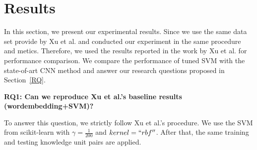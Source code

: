 \documentclass[sigconf,review, anonymous]{acmart}
\theoremstyle{break}
\begin{document}
\section{Results}
In this section, we present our experimental results. Since we use the same data set provide by Xu
et al.\cite{xu2016predicting} and conducted our experiment in the same procedure and metics. 
Therefore, we used the results reported in the work by Xu et al.\cite{xu2016predicting} for performance
comparison. We compare the performance of tuned SVM with the state-of-art CNN method and answer
our research questions proposed in Section~\ref{RQ}.


\textbf{RQ1: Can we reproduce Xu et al.'s baseline results (wordembedding+SVM)?}



To answer this question, we strictly follow Xu et al.'s procedure\cite{xu2016predicting}. We 
use the SVM from scikit-learn with $\gamma = \frac{1}{200}$ and $kernel= ``rbf''$. After that,
the same training and testing knowledge unit pairs are applied.
\end{document}
